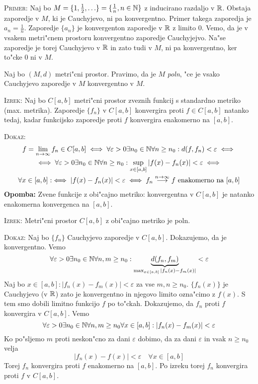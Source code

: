 \textsc{Primer:} Naj bo $M = \{ 1, \frac{1}{2}, \ldots \} = \{ \frac{1}{n}, n \in \mathbb{N} \}$ z inducirano razdaljo v $\mathbb{R}$. Obstaja zaporedje v $M$, ki je Cauchyjevo, ni pa konvergentno. Primer takega zaporedja je $a_n = \frac{1}{n}$. Zaporedje $\{ a_n \}$ je konvergenton zaporedje v $\mathbb{R}$ z limito 0. Vemo, da je v vsakem metri"cnem prostoru konvergentno zaporedje Cauchyjejvo. Na"se zaporedje je torej Cauchyjevo v $\mathbb{R}$ in zato tudi v $M$, ni pa konvergentno, ker to"cke 0 ni v $M$.

 Naj bo $(M, d)$ metri"cni prostor. Pravimo, da je $M$ \emph{poln}, "ce je vsako Cauchyjevo zaporedje v $M$ konvergentno v $M$.

\textsc{Izrek:} Naj bo $C[a, b]$ metri"cni prostor zveznih funkcij s standardno metriko (max. metrika). Zaporedje $\{ f_n \}$ v $C[a, b]$ konvergira proti $f \in C[a, b]$ natanko tedaj, kadar funkcijsko zaporedje proti $f$ konvergira enakomerno na $[a, b]$.

\textsc{Dokaz:}
\begin{multline*}
f = \lim_{n \to \infty} f_n \in C[a, b] \iff \forall \varepsilon> 0 \exists n_0 \in \mathbb{N} \forall n \geq n_0: d(f, f_n) < \varepsilon \iff \\
\iff \forall \varepsilon > 0 \exists n_0 \in \mathbb{N} \forall n \geq n_0: \sup_{x \in [a, b]} |f(x) - f_n(x)| < \varepsilon \iff \\
\forall x \in [a, b]: \iff |f(x) - f_n(x)| < \varepsilon \iff f_n \stackrel{n \to \infty}{\longrightarrow} f \text{ enakomerno na $[a, b]$}
\end{multline*}
\textbf{Opomba:} Zvene funkcije z obi"cajno metriko: konvergentna v $C[a, b]$ je natanko enakomerna konvergenca na $[a, b]$.

\textsc{Izrek:} Metri"cni prostor $C[a, b]$ z obi"cajno metriko je poln.

\textsc{Dokaz:} Naj bo $\{ f_n \}$ Cauchyjevo zaporedje v $C[a, b]$. Dokazujemo, da je konvergentno. Vemo
\begin{equation*}
\forall \varepsilon > 0 \exists n_0 \in \mathbb{N} \forall n, m \geq n_0: \underbrace{d(f_n, f_m)}_{\max_{x \in [a, b]} |f_n(x) - f_m(x)|} < \varepsilon
\end{equation*}
Naj bo $x \in [a, b]: |f_n(x) - f_m(x)| < \varepsilon$ za vse $m, n \geq n_0$. $\{ f_n(x) \}$ je Cauchyjevo (v $\mathbb{R}$) zato je konvergentno in njegovo limito ozna"cimo z $f(x)$. S tem smo dobili limitno funkcijo $f$ po to"ckah. Dokazujemo, da $f_n$ proti $f$ konvergira v $C[a, b]$. Vemo
\begin{equation*}
\forall \varepsilon > 0 \exists n_0 \in \mathbb{N} \forall n, m \geq n_0 \forall x \in [a, b]: |f_n(x) - f_m(x)| < \varepsilon
\end{equation*}
Ko po"sljemo $m$ proti neskon"cno za dani $\varepsilon$ dobimo, da za dani $\varepsilon$ in vsak $n \geq n_0$ velja
\begin{equation*}
|f_n(x) - f(x)| < \varepsilon \quad \forall x \in [a, b]
\end{equation*}
Torej $f_n$ konvergira proti $f$ enakomerno na $[a, b]$. Po izreku torej $f_n$ konvergira proti $f$ v $C[a, b]$.

